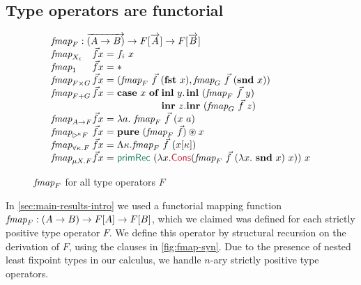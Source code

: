 \subsection{Type operators are functorial}
\label{sec:functorial}

\newcommand{\ora}[1]{\overrightarrow{#1}}

\begin{figure}[t]
  \centering
\begin{displaymath}
  \begin{array}{l@{}c@{}c@{}c@{}c@{}l}
    \ident{fmap}_F : \overrightarrow{(A \to B)} \to F[\overrightarrow{A}] \to F[\overrightarrow{B}] \\
    \begin{array}{@{}l@{}l@{}l@{\hspace{0.3em}}c@{\hspace{0.3em}}l}
    \ident{fmap}_{X_i}&\vec{f}&x & = & f_i~x \\
    \ident{fmap}_1    &\vec{f}&x & = & * \\
    \ident{fmap}_{F \times G}&\vec{f}&x & = & (\ident{fmap}_F~\vec{f}~(\kw{fst}~x), \ident{fmap}_G~\vec{f}~(\kw{snd}~x)) \\
    \ident{fmap}_{F + G}&\vec{f}&x & = & \kw{case}~x~\kw{of}~
    \begin{array}[t]{@{}l@{}l}
      \kw{inl}~y. & \kw{inl}~(\ident{fmap}_F~\vec{f}~y) \\
      \kw{inr}~z. & \kw{inr}~(\ident{fmap}_G~\vec{f}~z)
    \end{array}\\
    \ident{fmap}_{A\to F}&\vec{f}&x&=&\lambda a.~\ident{fmap}_F~\vec{f}~(x~a) \\
    \ident{fmap}_{\delayX\kappa F}&\vec{f}&x&=&\kw{pure}~(\ident{fmap}_F~\vec{f}) \circledast x \\
    \ident{fmap}_{\forall\kappa.F}&\vec{f}&x&=&\Lambda \kappa. \ident{fmap}_F~\vec{f}~(x[\kappa]) \\
    \ident{fmap}_{\mu X. F}&\vec{f}&x&=&\elim{primRec}~(\lambda x. \cons{Cons}(\ident{fmap}_F~\vec{f}~(\lambda x.~\kw{snd}~x)~x))~x      
    \end{array}
  \end{array}
\end{displaymath}  
  \caption{$\textit{fmap}_F$ for all type operators $F$}
  \label{fig:fmap-syn}
\end{figure}

In \autoref{sec:main-results-intro} we used a functorial mapping
function $\textit{fmap}_F : (A \to B) \to F[A] \to F[B]$, which we
claimed was defined for each strictly positive type operator $F$. We
define this operator by structural recursion on the derivation of $F$,
using the clauses in \autoref{fig:fmap-syn}. Due to the presence of
nested least fixpoint types in our calculus, we handle $n$-ary
strictly positive type operators.

